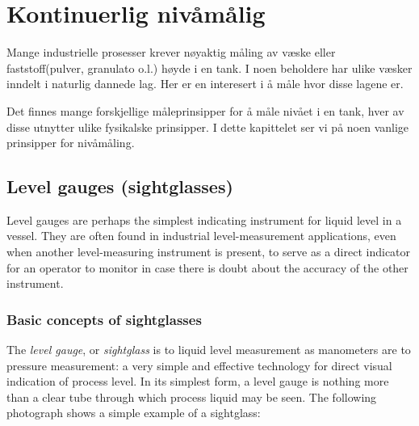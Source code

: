 
\chapter{Kontinuerlig nivåmålig}

Mange industrielle prosesser krever nøyaktig måling av væske eller faststoff(pulver, granulato o.l.) høyde i en tank. I noen beholdere har ulike væsker inndelt i naturlig dannede lag. Her er en interesert i å måle hvor disse lagene er. 

Det finnes mange forskjellige måleprinsipper for å måle nivået i en tank, hver av disse utnytter ulike fysikalske prinsipper. I dette kapittelet ser vi på noen vanlige prinsipper for nivåmåling.





\filbreak
\section{Level gauges (sightglasses)}

Level gauges are perhaps the simplest indicating instrument for liquid level in a vessel.  They are often found in industrial level-measurement applications, even when another level-measuring instrument is present, to serve as a direct indicator for an operator to monitor in case there is doubt about the accuracy of the other instrument.





\filbreak
\subsection{Basic concepts of sightglasses}

The \textit{level gauge}, or \textit{sightglass} is to liquid level measurement as manometers are to pressure measurement: a very simple and effective technology for direct visual indication of process level.  In its simplest form, a level gauge is nothing more than a clear tube through which process liquid may be seen.  The following photograph shows a simple example of a sightglass:  

